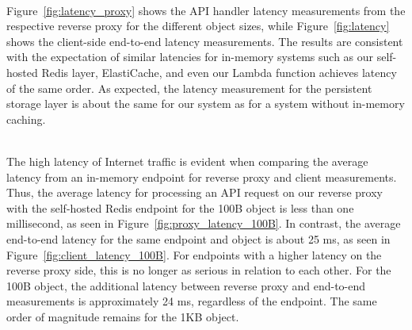 
~\\
Figure~\ref{fig:latency_proxy} shows the API handler latency measurements from the respective reverse proxy for the different object sizes, while Figure~\ref{fig:latency} shows the client-side end-to-end latency measurements. The results are consistent with the expectation of similar latencies for in-memory systems such as our self-hosted Redis layer, ElastiCache, and even our Lambda function achieves latency of the same order. As expected, the latency measurement for the persistent storage layer is about the same for our system as for a system without in-memory caching. 

~\\
The high latency of Internet traffic is evident when comparing the average latency from an in-memory endpoint for reverse proxy and client measurements. Thus, the average latency for processing an API request on our reverse proxy with the self-hosted Redis endpoint for the 100B object is less than one millisecond, as seen in Figure~\ref{fig:proxy_latency_100B}. In contrast, the average end-to-end latency for the same endpoint and object is about 25 ms, as seen in Figure~\ref{fig:client_latency_100B}. For endpoints with a higher latency on the reverse proxy side, this is no longer as serious in relation to each other. For the 100B object, the additional latency between reverse proxy and end-to-end measurements is approximately 24 ms, regardless of the endpoint. The same order of magnitude remains for the 1KB object. 

